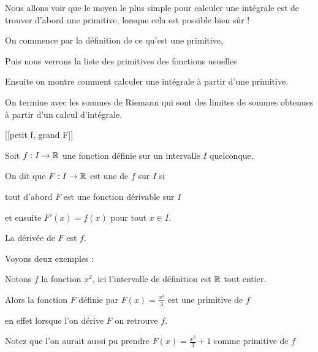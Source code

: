 







\debuttexte

\diapo

Nous allons voir que le moyen le plus simple pour calculer une intégrale
est de trouver d'abord une primitive, lorsque cela est possible bien sûr !

\change

\change

On commence par la définition de ce qu'est une primitive,

\change

Puis nous verrons la liste des primitives des fonctions usuelles

\change

Ensuite on montre comment calculer une intégrale à partir d'une primitive.

\change

On termine avec les sommes de Riemann
qui sont des limites de sommes obtenues à partir d'un calcul d'intégrale.


\diapo

[[petit f, grand F]]

Soit $f:I \to \mathbb{R}$ une fonction définie sur un intervalle $I$ quelconque. 


On dit que $F : I \to \mathbb{R}$ est une  de $f$ sur $I$ si

tout d'abord 
$F$ est une fonction dérivable sur $I$ 

et ensuite $F'(x)=f(x)$ pour tout $x \in I$. 

La dérivée de $F$ est $f$.

\change


Voyons deux exemples :

Notons $f$ la fonction $x^2$, ici l'intervalle de définition est $\mathbb{R}$ tout entier.

\change

Alors la fonction  $F$ définie par $F(x) = \frac{x^3}{3}$ est une primitive de $f$

en effet lorsque l'on dérive $F$ on retrouve $f$.

\change

Notez que l'on aurait aussi pu prendre $F(x)= \frac{x^3}{3}+1$ comme primitive de $f$


